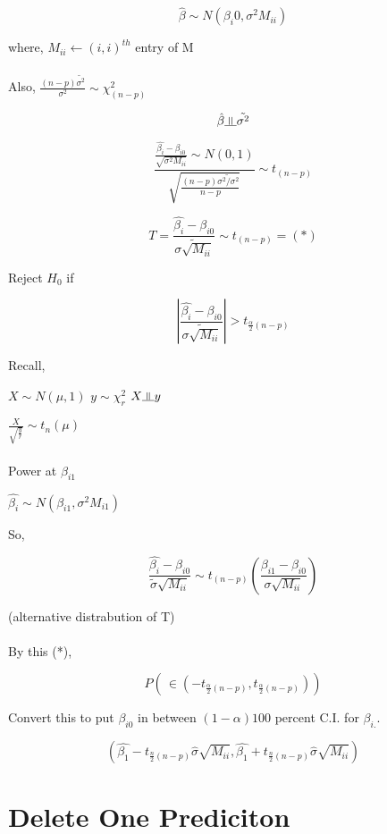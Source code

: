 \documentclass[11pt,fleqn]{book} %
\newcommand{\indep}{\rotatebox[origin=c]{90}{$\models$}}
\begin{document}
	$$\hat{\beta} \sim N(\beta_i0, \sigma^2 M_{ii}) $$

where, $M_{ii} \leftarrow (i,i)^{th}$ entry of M\\
\\

Also,  $\frac{(n-p)\tilde{\sigma^2}}{\sigma^2} \sim \chi^2_{(n-p)}$

$$\hat{\beta} \indep \tilde{\sigma^2} $$


$$\frac{\frac{\hat{\beta_i}- \beta_{i0}}{\sqrt{\sigma^2 M_{ii}}} \sim N(0,1) }{\sqrt{\frac{(n-p) \tilde{\sigma^2 / \sigma^2}}{n-p}}} \sim t_{(n-p)}$$

$$T = \frac{\hat{\beta_i} - \beta_{i0}}{\tilde{\sigma \sqrt{M_{ii}}}} \sim t_{(n-p)} = (*)$$

Reject $H_0$ if 

$$|\frac{\hat{\beta_i} - \beta_{i0}}{\tilde{\sigma \sqrt{M_{ii}}}} | > t_{\frac{\alpha}{2}(n-p)} $$


Recall, 


$X \sim N(\mu, 1)$
$y \sim \chi^2_r$
$X \indep y$

$\frac{X}{\sqrt{\frac{y}{r}}} \sim t_n(\mu)$\\
\\

Power at $\beta_{i1}$

$\hat{\beta_i} \sim N(\beta_{i1}, \sigma^2 M_{i1})$

So, 

$$ \frac{\hat{\beta_i} - \beta_{i0}}{\tilde{\sigma} \sqrt{M_{ii}}} \sim t_{(n-p)}(\frac{\beta_{i1} - \beta_{i0}}{\sigma \sqrt{M_{ii}}})$$

(alternative distrabution of T)\\
\\
By this (*), 

$$P(\frac{}{} \in (-t_{\frac{\alpha}{2}(n-p)}, t_{\frac{\alpha}{2}(n-p)})) $$



Convert this to put $\beta_{i0}$ in between $(1-\alpha)100$ percent C.I. for $\beta_{i.}$. 

$$(\hat{\beta_1} - t_{\frac{n}{2}(n-p)} \hat{\sigma} \sqrt{M_{ii}}, \hat{\beta_1} + t_{\frac{n}{2}(n-p)} \hat{\sigma} \sqrt{M_{ii}}) $$


\section{Delete One Prediciton}
\end{document}
